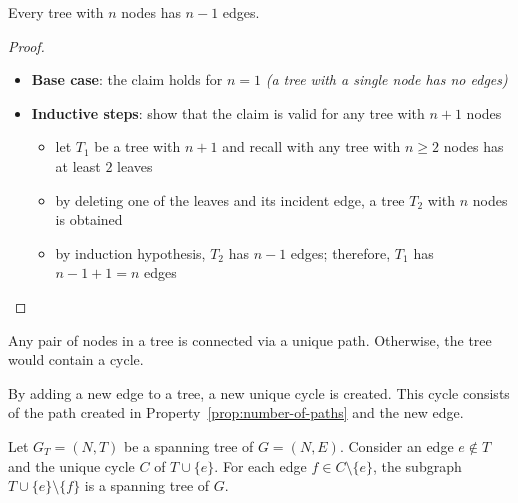 \documentclass[english]{article}
\begin{document}
\begin{minipage}{0.995\textwidth}
  \begin{property}
    Every tree with \(n\) nodes has \(n-1\) edges.
  \end{property}

  \begin{proof}
    \hfill
    \begin{itemize}
      \item \textbf{Base case}: the claim holds for \(n=1\) \textit{(a tree with a single node has no edges)}
      \item \textbf{Inductive steps}: show that the claim is valid for any tree with \(n + 1\) nodes
            \begin{itemize}
              \item let \(T_1\) be a tree with \(n+1\) and recall with any tree with \(n \geq 2\) nodes has at least \(2\) leaves
              \item by deleting one of the leaves and its incident edge, a tree \(T_2\) with \(n\) nodes is obtained
              \item by induction hypothesis, \(T_2\) has \(n-1\) edges; therefore, \(T_1\) has \(n-1+1=n\) edges
            \end{itemize}
    \end{itemize}
  \end{proof}
\end{minipage}

\begin{property}
  Any pair of nodes in a tree is connected via a unique path.
  Otherwise, the tree would contain a cycle.
  \label{prop:number-of-paths}
\end{property}

\begin{property}
  By adding a new edge to a tree, a new unique cycle is created.
  This cycle consists of the path created in Property~\ref{prop:number-of-paths} and the new edge.
\end{property}

\begin{property}
  Let \(G_T = (N, T)\) be a spanning tree of \(G = (N, E)\).
  Consider an edge \(e \notin T\) and the unique cycle \(C\) of \(T \cup \{e\}\).
  For each edge \(f \in C \setminus \{e\}\), the subgraph \(T \cup \{e\} \setminus \{f\}\) is a spanning tree of \(G\).
\end{property}
\end{document}
